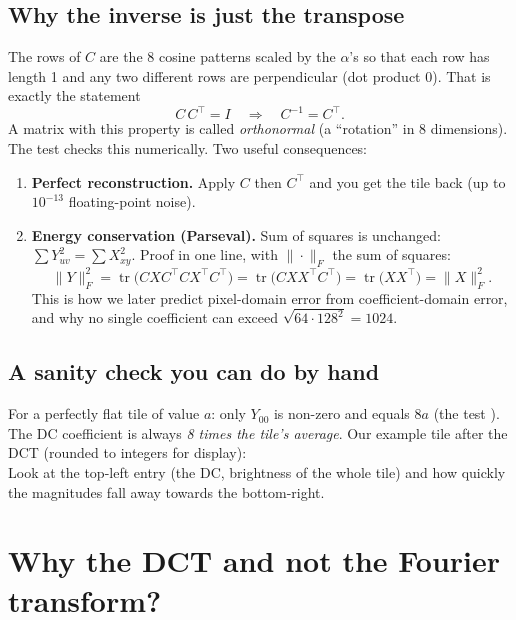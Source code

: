 \subsection{Why the inverse is just the transpose}

The rows of $C$ are the 8 cosine patterns scaled by the $\alpha$'s so that each row has length 1 and any two different rows are perpendicular (dot product 0). That is exactly the statement
\begin{equation}
C\,C^{\!\top} = I \quad\Longrightarrow\quad C^{-1}=C^{\!\top}.
\end{equation}
A matrix with this property is called \emph{orthonormal} (a ``rotation'' in 8 dimensions). The test  checks this numerically. Two useful consequences:

\begin{enumerate}
\item \textbf{Perfect reconstruction.} Apply $C$ then $C^{\top}$ and you get the tile back (up to $10^{-13}$ floating-point noise).
\item \textbf{Energy conservation (Parseval).} Sum of squares is unchanged: $\sum Y_{uv}^2=\sum X_{xy}^2$. Proof in one line, with $\|\cdot\|_F$ the sum of squares:
\[
\|Y\|_F^2=\operatorname{tr}\!\big(C X C^{\!\top} C X^{\!\top} C^{\!\top}\big)=\operatorname{tr}\!\big(C X X^{\!\top} C^{\!\top}\big)=\operatorname{tr}\!\big(X X^{\!\top}\big)=\|X\|_F^2 .
\]
This is how we later predict pixel-domain error from coefficient-domain error, and why no single coefficient can exceed $\sqrt{64\cdot128^2}=1024$.
\end{enumerate}

\subsection{A sanity check you can do by hand}

For a perfectly flat tile of value $a$: only $Y_{00}$ is non-zero and equals $8a$ (the test ). The DC coefficient is always \emph{8 times the tile's average}. Our example tile after the DCT (rounded to integers for display):
\[

\]
Look at the top-left entry (the DC, brightness of the whole tile) and how quickly the magnitudes fall away towards the bottom-right.

\section{Why the DCT and not the Fourier transform?}

